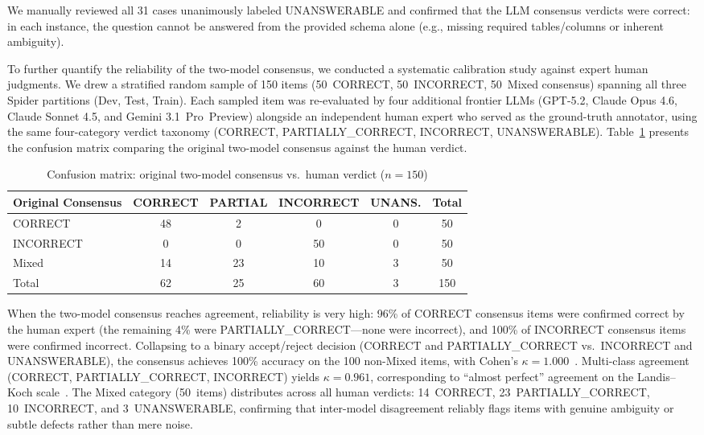 \documentclass[]{einformatica}
\begin{document}
We manually reviewed all 31 cases unanimously labeled UNANSWERABLE and confirmed that the LLM consensus verdicts were correct: in each instance, the question cannot be answered from the provided schema alone (e.g., missing required tables/columns or inherent ambiguity).

\label{sec:calibration}To further quantify the reliability of the two-model consensus, we conducted a systematic calibration study against expert human judgments. We drew a stratified random sample of 150 items (50~CORRECT, 50~INCORRECT, 50~Mixed consensus) spanning all three Spider partitions (Dev, Test, Train). Each sampled item was re-evaluated by four additional frontier LLMs (GPT-5.2, Claude Opus 4.6, Claude Sonnet 4.5, and Gemini 3.1~Pro~Preview) alongside an independent human expert who served as the ground-truth annotator, using the same four-category verdict taxonomy (CORRECT, PARTIALLY\_CORRECT, INCORRECT, UNANSWERABLE). Table~\ref{tab:calibration} presents the confusion matrix comparing the original two-model consensus against the human verdict.

\begin{table}[ht]
    \caption{Confusion matrix: original two-model consensus vs.\ human verdict ($n=150$)}
    \label{tab:calibration}
    \centering
    \footnotesize
    \begin{tabular}{lccccc}
        \toprule
        \textbf{Original Consensus} & \textbf{CORRECT} & \textbf{PARTIAL} & \textbf{INCORRECT} & \textbf{UNANS.} & \textbf{Total} \\
        \midrule
        CORRECT          & 48 & 2  & 0  & 0 & 50 \\
        INCORRECT        & 0  & 0  & 50 & 0 & 50 \\
        Mixed            & 14 & 23 & 10 & 3 & 50 \\
        \midrule
        Total            & 62 & 25 & 60 & 3 & 150 \\
        \bottomrule
    \end{tabular}
\end{table}

When the two-model consensus reaches agreement, reliability is very high: 96\% of CORRECT consensus items were confirmed correct by the human expert (the remaining 4\% were PARTIALLY\_CORRECT---none were incorrect), and 100\% of INCORRECT consensus items were confirmed incorrect. Collapsing to a binary accept/reject decision (CORRECT and PARTIALLY\_CORRECT vs.\ INCORRECT and UNANSWERABLE), the consensus achieves 100\% accuracy on the 100 non-Mixed items, with Cohen's $\kappa = 1.000$~\cite{cohen1960coefficient}. Multi-class agreement (CORRECT, PARTIALLY\_CORRECT, INCORRECT) yields $\kappa = 0.961$, corresponding to ``almost perfect'' agreement on the Landis--Koch scale~\cite{landis1977measurement}. The Mixed category (50~items) distributes across all human verdicts: 14~CORRECT, 23~PARTIALLY\_CORRECT, 10~INCORRECT, and 3~UNANSWERABLE, confirming that inter-model disagreement reliably flags items with genuine ambiguity or subtle defects rather than mere noise.
\end{document}
